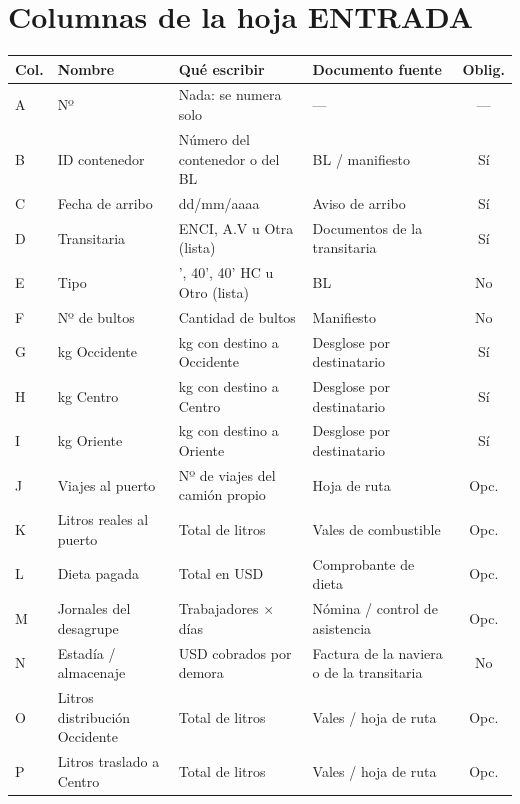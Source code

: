 \chapter{Columnas de la hoja ENTRADA}\label{anx:columnas}

\renewcommand{\arraystretch}{1.25}
\begin{longtable}{@{}l>{\raggedright\arraybackslash}p{3.9cm}>{\raggedright\arraybackslash}p{4.9cm}>{\raggedright\arraybackslash}p{3.6cm}c@{}}
\toprule
\textbf{Col.} & \textbf{Nombre} & \textbf{Qué escribir} & \textbf{Documento fuente} & \textbf{Oblig.} \\ \midrule
\endhead
A & Nº & Nada: se numera solo & --- & --- \\
B & ID contenedor & Número del contenedor o del BL & BL / manifiesto & Sí \\
C & Fecha de arribo & dd/mm/aaaa & Aviso de arribo & Sí \\
D & Transitaria & ENCI, A.V u Otra (lista) & Documentos de la transitaria & Sí \\
E & Tipo & 20', 40', 40' HC u Otro (lista) & BL & No \\
F & Nº de bultos & Cantidad de bultos & Manifiesto & No \\
G & kg Occidente & kg con destino a Occidente & Desglose por destinatario & Sí \\
H & kg Centro & kg con destino a Centro & Desglose por destinatario & Sí \\
I & kg Oriente & kg con destino a Oriente & Desglose por destinatario & Sí \\
J & Viajes al puerto & Nº de viajes del camión propio & Hoja de ruta & Opc. \\
K & Litros reales al puerto & Total de litros & Vales de combustible & Opc. \\
L & Dieta pagada & Total en USD & Comprobante de dieta & Opc. \\
M & Jornales del desagrupe & Trabajadores $\times$ días & Nómina / control de asistencia & Opc. \\
N & Estadía / almacenaje & USD cobrados por demora & Factura de la naviera o de la transitaria & No \\
O & Litros distribución Occidente & Total de litros & Vales / hoja de ruta & Opc. \\
P & Litros traslado a Centro & Total de litros & Vales / hoja de ruta & Opc. \\

\end{longtable}
